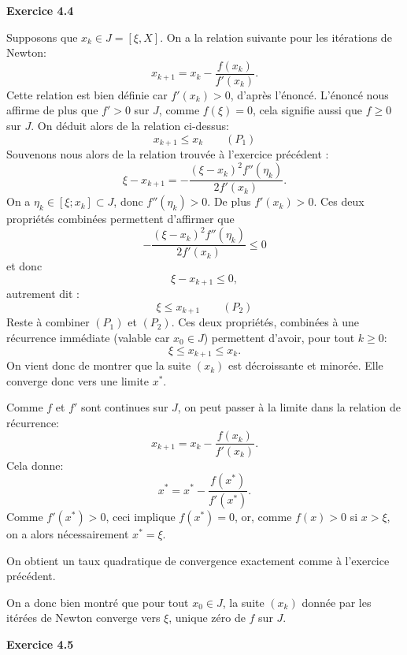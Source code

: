 \documentclass{article}
\begin{document}
{\bf Exercice 4.4}

\medskip

Supposons que $x_k \in J = [ \xi , X ]$. On a la relation suivante pour les itérations de Newton:
\[
x_{k+1} = x_k - \frac{f(x_k)}{f'(x_k)}. 
\]
Cette relation est bien définie car $f'(x_k) > 0$, d'après l'énoncé.
L'énoncé nous affirme de plus que $f'>0$ sur $J$, comme $f(\xi)=0$, cela signifie aussi que $f\geq0$ sur $J$. On déduit alors de la relation ci-dessus:
\[
x_{k+1} \leq x_k \qquad (P_1)
\]
Souvenons nous alors de la relation trouvée à l'exercice précédent :
\[
    \xi - x_{k+1} = - \frac{(\xi - x_k)^2 f''(\eta_k)}{2 f'(x_k)}.
\]
On a $\eta_k \in [\xi;x_k] \subset J$, donc $f''(\eta_k)> 0$. De plus $f'(x_k)>0$. Ces deux propriétés combinées permettent d'affirmer que
\[
    - \frac{(\xi - x_k)^2 f''(\eta_k)}{2 f'(x_k)} \leq 0 
\]
et donc
\[
    \xi - x_{k+1} \leq 0,
\]
autrement dit :
\[
\xi \leq  x_{k+1} \qquad (P_2)
\]
Reste à combiner $(P_1)$ et $(P_2)$. Ces deux propriétés, combinées à une récurrence immédiate (valable car $x_0 \in J$) permettent d'avoir, pour tout $k\geq0$:
\[
\xi \leq  x_{k+1} \leq x_k.
\]
On vient donc de montrer que la suite $(x_k)$ est décroissante et minorée. Elle converge donc vers une limite $x^*$.

Comme $f$ et $f'$ sont continues sur $J$, on peut passer à la limite dans la relation de récurrence:
\[
x_{k+1} = x_k - \frac{f(x_k)}{f'(x_k)}. 
\]
Cela donne:
\[
x^* = x^* - \frac{f(x^*)}{f'(x^*)}. 
\]
Comme $f'(x^*)>0$, ceci implique $f(x^*)=0$, or, comme $f(x)>0$ si $x>\xi$, on a alors nécessairement $x^*=\xi$.

On obtient un taux quadratique de convergence exactement comme à l'exercice précédent.

\medskip

On a donc bien montré que pour tout $x_0 \in J$, la suite $(x_k)$ donnée par les itérées de Newton converge vers $\xi$, unique zéro de $f$ sur $J$.

\medskip

{\bf Exercice 4.5}
\end{document}
